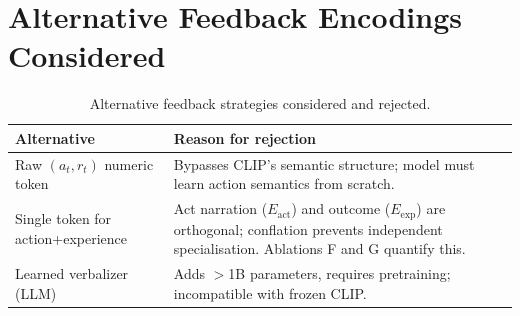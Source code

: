 \documentclass{article}
\newcommand{\Lact}{$E_{\mathrm{act}}$\xspace}
\newcommand{\Lexp}{$E_{\mathrm{exp}}$\xspace}
\begin{document}
\section{Alternative Feedback Encodings Considered}
\label{app:alternatives}

\begin{table}[h]
\centering
\small
\begin{tabular}{L{4cm}L{8cm}}
\toprule
\textbf{Alternative} & \textbf{Reason for rejection} \\
\midrule
Raw $(a_t,r_t)$ numeric token &
  Bypasses CLIP's semantic structure; model must learn action semantics from scratch. \\
Single token for action+experience &
  Act narration (\Lact) and outcome (\Lexp) are orthogonal; conflation prevents
  independent specialisation. Ablations F and G quantify this. \\
Learned verbalizer (LLM) &
  Adds $>$1B parameters, requires pretraining; incompatible with frozen CLIP. \\
\bottomrule
\end{tabular}
\caption{Alternative feedback strategies considered and rejected.}
\label{tab:alternatives}
\end{table}
\end{document}
